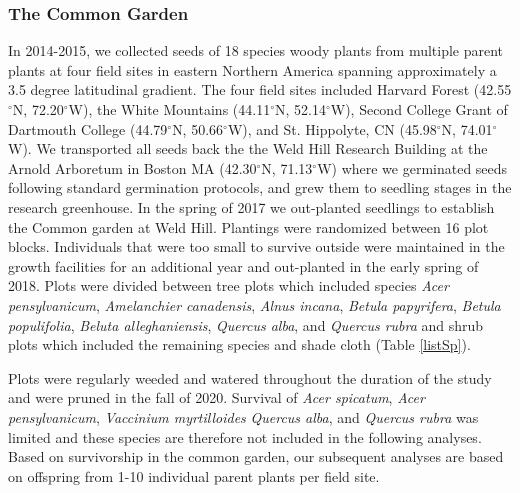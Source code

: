 \documentclass{article}[12pt]
\begin{document}
\subsubsection{The Common Garden}
In 2014-2015, we collected seeds of 18 species woody plants from multiple parent plants at four field sites in eastern Northern America spanning approximately a 3.5 degree latitudinal gradient. The four field sites included Harvard Forest (42.55$^{\circ}$N, 72.20$^{\circ}$W), the White Mountains (44.11$^{\circ}$N, 52.14$^{\circ}$W), Second College Grant of Dartmouth College (44.79$^{\circ}$N, 50.66$^{\circ}$W), and St. Hippolyte, CN (45.98$^{\circ}$N, 74.01$^{\circ}$W). We transported all seeds back the the Weld Hill Research Building at the Arnold Arboretum in Boston MA (42.30$^{\circ}$N, 71.13$^{\circ}$W) where we germinated seeds following standard germination protocols, and grew them to seedling stages in the research greenhouse. In the spring of 2017 we out-planted seedlings to establish the Common garden at Weld Hill. Plantings were randomized between 16 plot blocks. Individuals that were too small to survive outside were maintained in the growth facilities for an additional year and out-planted in the early spring of 2018. Plots were divided between tree plots which included species  \textit{Acer pensylvanicum}, \textit{Amelanchier canadensis}, \textit{Alnus incana}, \textit{Betula papyrifera}, \textit{Betula populifolia}, \textit{Beluta alleghaniensis}, \textit{Quercus alba}, and \textit{Quercus rubra} and shrub plots which included the remaining species and shade cloth (Table \ref{listSp}). 

Plots were regularly weeded and watered throughout the duration of the study and were pruned in the fall of 2020. Survival of \textit{Acer spicatum}, \textit{Acer pensylvanicum}, \emph{Vaccinium myrtilloides} \textit{Quercus alba}, and \textit{Quercus rubra} was limited and these species are therefore not included in the following analyses. Based on survivorship in the common garden, our subsequent analyses are based on offspring from 1-10 individual parent plants per field site.
\end{document}
